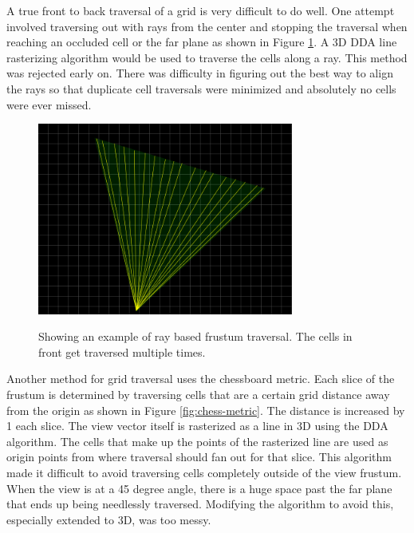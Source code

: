 \documentclass[12pt]{ucthesis}
\newcommand{\captionfonts}{\small\bf\ssp}
\begin{document}
A true front to back traversal of a grid is very difficult to do well.
One attempt involved traversing out with rays from the center and stopping the traversal when reaching an occluded cell or the far plane as shown in Figure \ref{fig:vf-ray-traversal}.
A 3D DDA line rasterizing algorithm would be used to traverse the cells along a ray.\cite{dda-line}
This method was rejected early on.
There was difficulty in figuring out the best way to align the rays so that duplicate cell traversals were minimized and absolutely no cells were ever missed.

\begin{figure}
\begin{center}
\includegraphics[width=0.75\textwidth]{Images/rayTraversal.png}
\captionfonts
\caption[Ray Based Traversal]{Showing an example of ray based frustum traversal. The cells in front get traversed multiple times.}
\label{fig:vf-ray-traversal}
\end{center}
\end{figure}

Another method for grid traversal uses the chessboard metric.\cite{chess}
Each slice of the frustum is determined by traversing cells that are a certain grid distance away from the origin as shown in Figure \ref{fig:chess-metric}.
The distance is increased by 1 each slice.
The view vector itself is rasterized as a line in 3D using the DDA algorithm.
The cells that make up the points of the rasterized line are used as origin points from where traversal should fan out for that slice.
This algorithm made it difficult to avoid traversing cells completely outside of the view frustum.
When the view is at a 45 degree angle, there is a huge space past the far plane that ends up being needlessly traversed.
Modifying the algorithm to avoid this, especially extended to 3D, was too messy.
\end{document}
